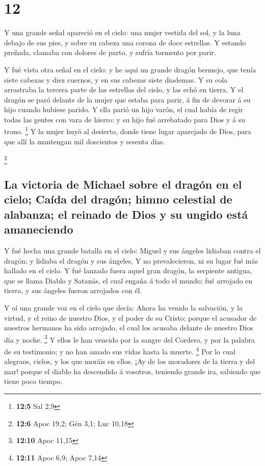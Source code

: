 \hypertarget{section-11}{%
\section{12}\label{section-11}}

 Y una grande señal apareció en el cielo: una mujer
vestida del sol, y la luna debajo de sus pies, y sobre su cabeza una
corona de doce estrellas.  Y estando preñada, clamaba con
dolores de parto, y sufría tormento por parir.

 Y fué vista otra señal en el cielo: y he aquí un grande
dragón bermejo, que tenía siete cabezas y diez cuernos, y en sus cabezas
siete diademas.  Y su cola arrastraba la tercera parte de
las estrellas del cielo, y las echó en tierra. Y el dragón se paró
delante de la mujer que estaba para parir, á fin de devorar á su hijo
cuando hubiese parido.  Y ella parió un hijo varón, el
cual había de regir todas las gentes con vara de hierro: y su hijo fué
arrebatado para Dios y á su trono. \footnote{\textbf{12:5} Sal 2,9}
 Y la mujer huyó al desierto, donde tiene lugar aparejado
de Dios, para que allí la mantengan mil doscientos y sesenta días.

\footnote{\textbf{12:6} Apoc 19,2; Gén 3,1; Luc 10,18}

\hypertarget{la-victoria-de-michael-sobre-el-draguxf3n-en-el-cielo-cauxedda-del-draguxf3n-himno-celestial-de-alabanza-el-reinado-de-dios-y-su-ungido-estuxe1-amaneciendo}{%
\subsection{La victoria de Michael sobre el dragón en el cielo; Caída
del dragón; himno celestial de alabanza; el reinado de Dios y su ungido
está
amaneciendo}\label{la-victoria-de-michael-sobre-el-draguxf3n-en-el-cielo-cauxedda-del-draguxf3n-himno-celestial-de-alabanza-el-reinado-de-dios-y-su-ungido-estuxe1-amaneciendo}}

 Y fué hecha una grande batalla en el cielo: Miguel y sus
ángeles lidiaban contra el dragón; y lidiaba el dragón y sus ángeles,
 Y no prevalecieron, ni su lugar fué más hallado en el
cielo.  Y fué lanzado fuera aquel gran dragón, la
serpiente antigua, que se llama Diablo y Satanás, el cual engaña á todo
el mundo; fué arrojado en tierra, y sus ángeles fueron arrojados con él.

 Y oí una grande voz en el cielo que decía: Ahora ha
venido la salvación, y la virtud, y el reino de nuestro Dios, y el poder
de su Cristo; porque el acusador de nuestros hermanos ha sido arrojado,
el cual los acusaba delante de nuestro Dios día y noche. \footnote{\textbf{12:10}
  Apoc 11,15}  Y ellos le han vencido por la sangre del
Cordero, y por la palabra de su testimonio; y no han amado sus vidas
hasta la muerte. \footnote{\textbf{12:11} Apoc 6,9; Apoc 7,14}
 Por lo cual alegraos, cielos, y los que moráis en ellos.
¡Ay de los moradores de la tierra y del mar! porque el diablo ha
descendido á vosotros, teniendo grande ira, sabiendo que tiene poco
tiempo.

